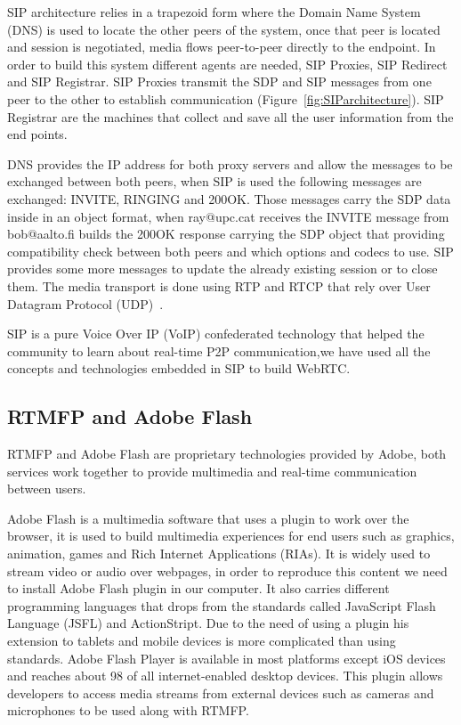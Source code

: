 SIP architecture relies in a trapezoid form where the Domain Name System (DNS) is used to locate the other peers of the system, once that peer is located and session is negotiated, media flows peer-to-peer directly to the endpoint. In order to build this system different agents are needed, SIP Proxies, SIP Redirect and SIP Registrar. SIP Proxies transmit the SDP and SIP messages from one peer to the other to establish communication (Figure~\ref{fig:SIParchitecture}). SIP Registrar are the machines that collect and save all the user information from the end points.

DNS provides the IP address for both proxy servers and allow the messages to be exchanged between both peers, when SIP is used the following messages are exchanged: INVITE, RINGING and 200OK. Those messages carry the SDP data inside in an object format, when ray@upc.cat receives the INVITE message from bob@aalto.fi builds the 200OK response carrying the SDP object that providing compatibility check between both peers and which options and codecs to use. SIP provides some more messages to update the already existing session or to close them. The media transport is done using RTP and RTCP that rely over User Datagram Protocol (UDP)~\cite{sipRFC}.

SIP is a pure Voice Over IP (VoIP) confederated technology that helped the community to learn about real-time P2P communication,we have used all the concepts and technologies embedded in SIP to build WebRTC.

\subsection{RTMFP and Adobe Flash}

RTMFP and Adobe Flash are proprietary technologies provided by Adobe, both services work together to provide multimedia and real-time communication between users.

Adobe Flash is a multimedia software that uses a plugin to work over the browser, it is used to build multimedia experiences for end users such as graphics, animation, games and Rich Internet Applications (RIAs). It is widely used to stream video or audio over webpages, in order to reproduce this content we need to install Adobe Flash plugin in our computer. It also carries different programming languages that drops from the standards called JavaScript Flash Language (JSFL) and ActionStript. Due to the need of using a plugin his extension to tablets and mobile devices is more complicated than using standards. Adobe Flash Player is available in most platforms except iOS devices and reaches about 98 of all internet-enabled desktop devices. This plugin allows developers to access media streams from external devices such as cameras and microphones to be used along with RTMFP.


